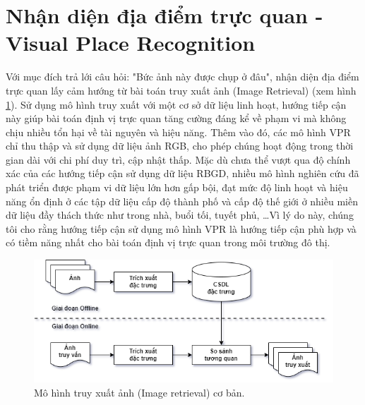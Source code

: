 \section{Nhận diện địa điểm trực quan - Visual Place Recognition}

Với mục đích trả lới câu hỏi: "Bức ảnh này được chụp ở đâu", nhận diện địa điểm trực quan lấy cảm hướng từ bài toán truy xuất ảnh (Image Retrieval) \cite{2022arXiv220105816X} (xem hình \ref{fig:ir}). Sử dụng mô hình truy xuất với một cơ sở dữ liệu linh hoạt, hướng tiếp cận này giúp bài toán định vị trực quan tăng cường đáng kể về phạm vi mà không chịu nhiều tổn hại về tài nguyên và hiệu năng. Thêm vào đó, các mô hình VPR chỉ thu thập và sử dụng dữ liệu ảnh RGB, cho phép chúng hoạt động trong thời gian dài với chi phí duy trì, cập nhật thấp. Mặc dù chưa thể vượt qua độ chính xác của các hướng tiếp cận sử dụng dữ liệu RBGD, nhiều mô hình nghiên cứu đã phát triển được phạm vi dữ liệu lớn hơn gấp bội, đạt mức độ linh hoạt và hiệu năng ổn định ở các tập dữ liệu cấp độ thành phố \cite{alibey2023mixvpr} và cấp độ thế giới \cite{keetha2023anyloc} ở nhiều miền dữ liệu đầy thách thức như trong nhà, buổi tối, tuyết phủ, \dots Vì lý do này, chúng tôi cho rằng hướng tiếp cận sử dụng mô hình VPR là hướng tiếp cận phù hợp và có tiềm năng nhất cho bài toán định vị trực quan trong môi trường đô thị.

\begin{figure}[h]
    \centering
    \includegraphics[width=\textwidth]{pics/Chapter2/IR.drawio.png}
    \caption[Mô hình truy xuất ảnh cơ bản]{Mô hình truy xuất ảnh (Image retrieval) cơ bản.}
    \label{fig:ir}
\end{figure}

